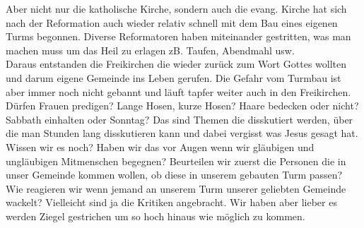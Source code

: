 \documentclass[14pt]{../../inc/mybib}
\begin{document}
    Aber nicht nur die katholische Kirche, sondern auch die evang. Kirche hat sich nach der Reformation auch wieder relativ schnell mit dem Bau eines eigenen Turms begonnen. Diverse Reformatoren haben miteinander gestritten, was man machen muss um das Heil zu erlagen zB. Taufen, Abendmahl usw.\\
    Daraus entstanden die Freikirchen die wieder zurück zum Wort Gottes wollten und darum eigene Gemeinde ins Leben gerufen. Die Gefahr vom Turmbau ist aber immer noch nicht gebannt und läuft tapfer weiter auch in den Freikirchen. Dürfen Frauen predigen? Lange Hosen, kurze Hosen? Haare bedecken oder nicht? Sabbath einhalten oder Sonntag? Das sind Themen die disskutiert werden, über die man Stunden lang disskutieren kann und dabei vergisst was Jesus gesagt hat. Wissen wir es noch? Haben wir das vor Augen wenn wir gläubigen und ungläubigen Mitmenschen begegnen? Beurteilen wir zuerst die Personen die in unser Gemeinde kommen wollen, ob diese in unserem gebauten Turm passen? Wie reagieren wir wenn jemand an unserem Turm unserer geliebten Gemeinde wackelt? Vielleicht sind ja die Kritiken angebracht. Wir haben aber lieber es werden Ziegel gestrichen um so hoch hinaus wie möglich zu kommen.
\end{document}
